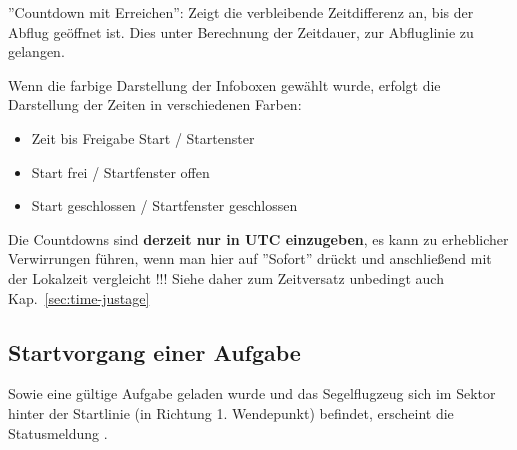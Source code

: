 ''Countdown mit Erreichen'':
Zeigt die verbleibende Zeitdifferenz an, bis der Abflug geöffnet ist. 
Dies unter Berechnung der Zeitdauer, zur Abfluglinie zu gelangen. 


Wenn die farbige Darstellung der Infoboxen gewählt wurde, erfolgt die Darstellung der Zeiten in verschiedenen 
Farben:

\begin{itemize}
 \item[]   Zeit bis Freigabe Start / Startenster
 \item[]   Start frei / Startfenster offen 
 \item[]   Start geschlossen / Startfenster geschlossen
 \end{itemize}

 Die Countdowns sind \textbf{derzeit nur in UTC einzugeben}, es kann zu erheblicher 
 \warning 
 Verwirrungen führen, wenn man hier auf ''Sofort'' drückt und anschließend mit der Lokalzeit vergleicht !!! Siehe daher zum Zeitversatz unbedingt auch Kap.~\ref{sec:time-justage}


\subsection*{Startvorgang einer Aufgabe}

Sowie eine gültige Aufgabe geladen wurde und das Segelflugzeug sich im Sektor hinter der Startlinie (in Richtung 1. Wendepunkt) befindet, erscheint die Statusmeldung .

